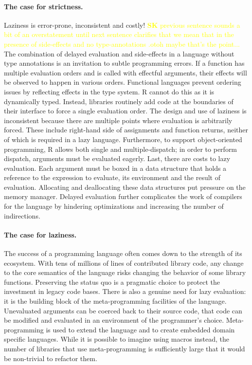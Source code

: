 \documentclass[review,nonacm,screen,acmsmall,anonymous=true]{acmart}
\newcommand{\authorcomment}[3]{\xspace\textcolor{#1}{{\bf #2} #3}\xspace}
\newcommand{\SK}[1]{\authorcomment{yellow}{SK}{#1}}
\begin{document}
\paragraph{The case for strictness.} Laziness is error-prone, inconsistent
and costly! \SK{previous sentence sounds a bit of an overstatement until next sentence clarifies that
we mean that in the presence of side-effects and no type-annotations .otoh maybe that's the point...} 
The combination of delayed evaluation and side-effects in a language
without type annotations is an invitation to subtle programming errors. If a
function has multiple evaluation orders and is called with effectful arguments,
their effects will be observed to happen in various orders. Functional languages
prevent ordering issues by reflecting effects in the type system. R cannot do
this as it is dynamically typed. Instead, libraries routinely add code at the
boundaries of their interface to force a single evaluation order. The design and
use of laziness is inconsistent because there are multiple points where
evaluation is arbitrarily forced. These include right-hand side of assignments
and function returns, neither of which is required in a lazy language.
Furthermore, to support object-oriented programming, R allows both single and
multiple-dispatch; in order to perform dispatch, arguments must be evaluated
eagerly. Last, there are costs to lazy evaluation. Each argument must be boxed
in a data structure that holds a reference to the expression to evaluate, its
environment and the result of evaluation. Allocating and deallocating these data
structures put pressure on the memory manager. Delayed evaluation further
complicates the work of compilers for the language by hindering optimizations
and increasing the number of indirections.

\paragraph{The case for laziness.} The success of a programming language
often comes down to the strength of its ecosystem. With tens of millions of
lines of contributed library code, any change to the core semantics of the
language risks changing the behavior of some library functions. Preserving the
status quo is a pragmatic choice to protect the investment in legacy code bases.
There is also a genuine need for lazy evaluation: it is the building block of
the meta-programming facilities of the language. Unevaluated arguments can be
coerced back to their source code, that code can be modified and evaluated in
an environment of the programmer's choice. Meta-programming is used to extend
the language and to create embedded domain specific languages. While it is
possible to imagine using macros instead, the number of libraries that use
meta-programming is sufficiently large that it would be non-trivial to refactor
them.
\end{document}
